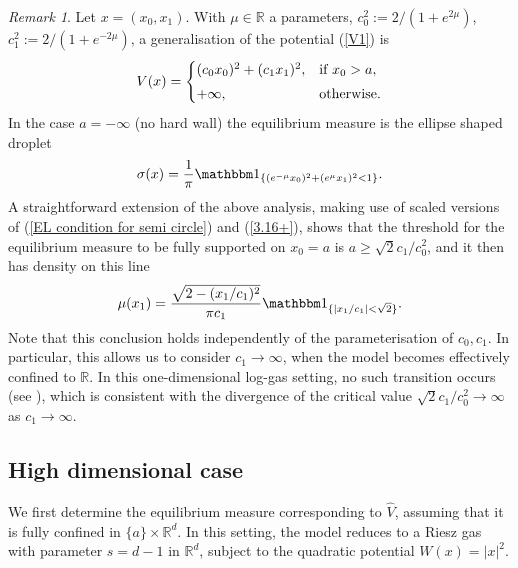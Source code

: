 \documentclass[10pt]{amsart}
\theoremstyle{plain}
\theoremstyle{remark}
\newtheorem{rem}{Remark}
\numberwithin{equation}{section}
\begin{document}
\begin{rem} \label{Rem_elliptic half space}
Let $x=(x_0,x_1)$. With $\mu \in \mathbb R$ a parameters, $c_0^2:= 2/(1 + e^{2 \mu})$, $c_1^2:= 2/(1 + e^{-2 \mu})$, a generalisation of the potential (\ref{V1}) is
\begin{equation}\label{V1a}
V({x}) = \begin{cases}
(c_0 x_0)^2 + (c_1 x_1)^2, &\textup{if } x_0 > a,
\smallskip 
\\
+\infty, &\textup{otherwise}. 
\end{cases}
\end{equation}
In the case $a = - \infty$ (no hard wall) the equilibrium measure is the ellipse shaped droplet \cite{CPR87,FJ96}
\begin{equation}\label{V2a}
\sigma(x) = {1 \over \pi} \mathbbm 1_{\{ (e^{-\mu} x_0)^2 +
(e^{\mu} x_1)^2 <1 \}}.
\end{equation}
A straightforward extension of the above analysis, making use of scaled versions of (\ref{EL condition for semi circle}) and (\ref{3.16+}), shows that the threshold for the equilibrium measure to be fully supported on $x_0=a$ is $a \ge  \sqrt{2} c_1/c_0^2$, and it then has density on this line
\begin{equation}\label{V2b}
\mu(x_1) = {\sqrt{2 - (x_1/c_1)^2} \over \pi c_1} \mathbbm 1_{\{|x_1/c_1| < \sqrt{2} \}}.
\end{equation} 
Note that this conclusion holds independently of the parameterisation of $c_0,c_1$. In particular, this allows us to consider $c_1 \to \infty$, when the model becomes effectively confined to $\mathbb{R}$. 
In this one-dimensional log-gas setting, no such transition occurs (see \cite{DM06}), 
which is consistent with the divergence of the critical value $ \sqrt{2} c_1/c_0^2 \to \infty$ as $c_1 \to \infty.$ 
\end{rem}


\subsection{High dimensional case} \label{S42}

We first determine the equilibrium measure corresponding to $\hat{V}$, assuming that it is fully confined in $\{a\} \times \mathbb{R}^d$. In this setting, the model reduces to a Riesz gas with parameter $s = d-1$ in $\mathbb{R}^d$, subject to the quadratic potential $W(x) = |x|^2$.
\end{document}
